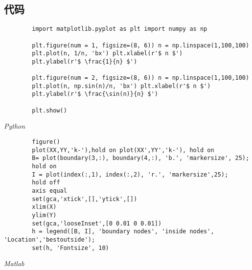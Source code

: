 \documentclass[a4paper, 12pt, UTF8]{ctexart}
\begin{document}
\begin{appendices}
    \section{代码}
\begin{listing}[ht]
    \begin{verbatim}
        import matplotlib.pyplot as plt import numpy as np
        
        plt.figure(num = 1, figsize=(8, 6)) n = np.linspace(1,100,100)
        plt.plot(n, 1/n, 'bx') plt.xlabel(r'$ n $')
        plt.ylabel(r'$ \frac{1}{n} $')
        
        plt.figure(num = 2, figsize=(8, 6)) n = np.linspace(1,100,100)
        plt.plot(n, np.sin(n)/n, 'bx') plt.xlabel(r'$ n $')
        plt.ylabel(r'$ \frac{\sin(n)}{n} $')
        
        plt.show()
    \end{verbatim}
    \caption{\em Python}
\end{listing}

\begin{listing}[ht]
    \begin{verbatim}
        figure()
        plot(XX,YY,'k-'),hold on plot(XX',YY','k-'), hold on
        B= plot(boundary(3,:), boundary(4,:), 'b.', 'markersize', 25);
        hold on
        I = plot(index(:,1), index(:,2), 'r.', 'markersize',25);
        hold off
        axis equal
        set(gca,'xtick',[],'ytick',[])
        xlim(X)
        ylim(Y)
        set(gca,'looseInset',[0 0.01 0 0.01])
        h = legend([B, I], 'boundary nodes', 'inside nodes', 'Location','bestoutside');
        set(h, 'Fontsize', 10)
    \end{verbatim}
    \caption{\em Matlab}
\end{listing}
\end{appendices}
\end{document}
